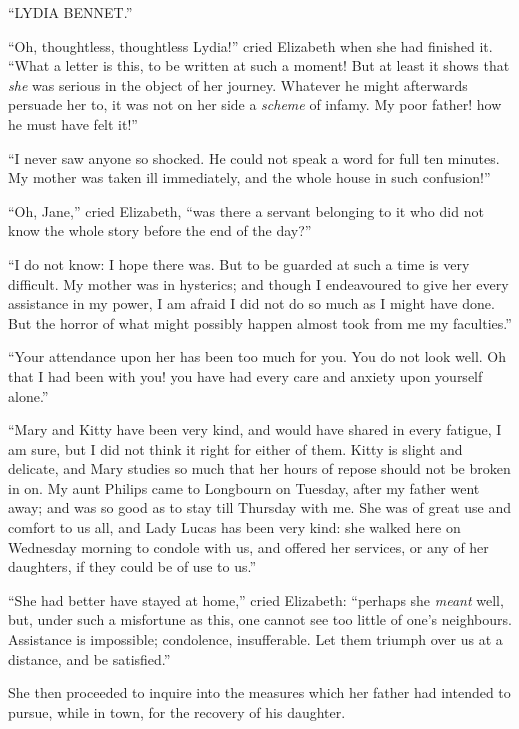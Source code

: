 \documentclass[12pt]{book}
\begin{document}
``LYDIA BENNET.''

``Oh, thoughtless, thoughtless Lydia!'' cried Elizabeth when she had finished it. ``What a letter is this, to be written at such a moment! But at least it shows that \textit{she} was serious in the object of her journey. Whatever he might afterwards persuade her to, it was not on her side a \textit{scheme} of infamy. My poor father! how he must have felt it!''

``I never saw anyone so shocked. He could not speak a word for full ten minutes. My mother was taken ill immediately, and the whole house in such confusion!''

``Oh, Jane,'' cried Elizabeth, ``was there a servant belonging to it who did not know the whole story before the end of the day?''

``I do not know: I hope there was. But to be guarded at such a time is very difficult. My mother was in hysterics; and though I endeavoured to give her every assistance in my power, I am afraid I did not do so much as I might have done. But the horror of what might possibly happen almost took from me my faculties.''

``Your attendance upon her has been too much for you. You do not look well. Oh that I had been with you! you have had every care and anxiety upon yourself alone.''

``Mary and Kitty have been very kind, and would have shared in every fatigue, I am sure, but I did not think it right for either of them. Kitty is slight and delicate, and Mary studies so much that her hours of repose should not be broken in on. My aunt Philips came to Longbourn on Tuesday, after my father went away; and was so good as to stay till Thursday with me. She was of great use and comfort to us all, and Lady Lucas has been very kind: she walked here on Wednesday morning to condole with us, and offered her services, or any of her daughters, if they could be of use to us.''

``She had better have stayed at home,'' cried Elizabeth: ``perhaps she \textit{meant} well, but, under such a misfortune as this, one cannot see too little of one's neighbours. Assistance is impossible; condolence, insufferable. Let them triumph over us at a distance, and be satisfied.''

She then proceeded to inquire into the measures which her father had intended to pursue, while in town, for the recovery of his daughter.
\end{document}
